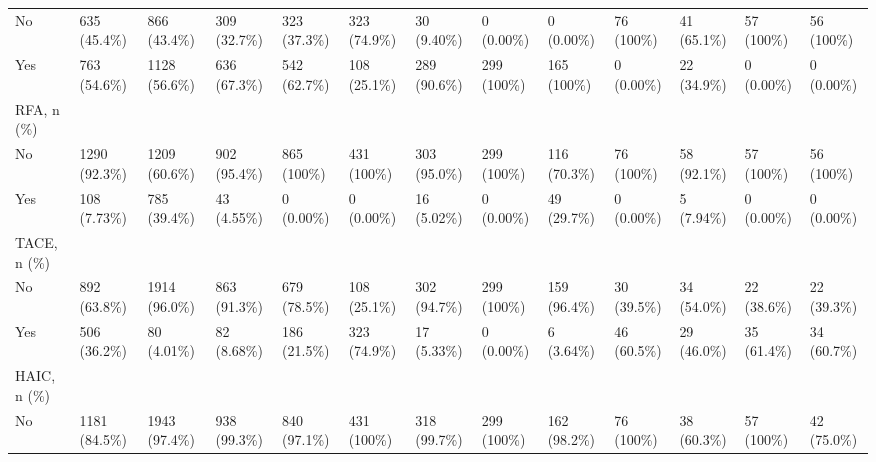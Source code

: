 \begin{landscape}
\begin{center}
\begin{longtable}{p{6.0cm}p{3.0cm}p{3.0cm}p{3.0cm}p{3.0cm}p{3.0cm}p{3.0cm}p{3.0cm}p{3.0cm}p{3.0cm}p{3.0cm}p{3.0cm}p{3.0cm}}
    No &   635 (45.4\%)    &   866 (43.4\%)    &   309 (32.7\%)    &   323 (37.3\%)    &   323 (74.9\%)    &    30 (9.40\%)    &    0 (0.00\%)     &    0 (0.00\%)     &    76 (100\%)     &    41 (65.1\%)    &    57 (100\%)     &    56 (100\%)     \\
    Yes &   763 (54.6\%)    &   1128 (56.6\%)   &   636 (67.3\%)    &   542 (62.7\%)    &   108 (25.1\%)    &   289 (90.6\%)    &    299 (100\%)    &    165 (100\%)    &    0 (0.00\%)     &    22 (34.9\%)    &    0 (0.00\%)     &    0 (0.00\%)     \\
RFA, n (\%) &                  &                  &                  &                  &                  &                  &                  &                  &                  &                  &                  &                  \\
    No &   1290 (92.3\%)   &   1209 (60.6\%)   &   902 (95.4\%)    &    865 (100\%)    &    431 (100\%)    &   303 (95.0\%)    &    299 (100\%)    &   116 (70.3\%)    &    76 (100\%)     &    58 (92.1\%)    &    57 (100\%)     &    56 (100\%)     \\
    Yes &   108 (7.73\%)    &   785 (39.4\%)    &    43 (4.55\%)    &    0 (0.00\%)     &    0 (0.00\%)     &    16 (5.02\%)    &    0 (0.00\%)     &    49 (29.7\%)    &    0 (0.00\%)     &    5 (7.94\%)     &    0 (0.00\%)     &    0 (0.00\%)     \\
TACE, n (\%) &                  &                  &                  &                  &                  &                  &                  &                  &                  &                  &                  &                  \\
    No &   892 (63.8\%)    &   1914 (96.0\%)   &   863 (91.3\%)    &   679 (78.5\%)    &   108 (25.1\%)    &   302 (94.7\%)    &    299 (100\%)    &   159 (96.4\%)    &    30 (39.5\%)    &    34 (54.0\%)    &    22 (38.6\%)    &    22 (39.3\%)    \\
    Yes &   506 (36.2\%)    &    80 (4.01\%)    &    82 (8.68\%)    &   186 (21.5\%)    &   323 (74.9\%)    &    17 (5.33\%)    &    0 (0.00\%)     &    6 (3.64\%)     &    46 (60.5\%)    &    29 (46.0\%)    &    35 (61.4\%)    &    34 (60.7\%)    \\
HAIC, n (\%) &                  &                  &                  &                  &                  &                  &                  &                  &                  &                  &                  &                  \\
    No &   1181 (84.5\%)   &   1943 (97.4\%)   &   938 (99.3\%)    &   840 (97.1\%)    &    431 (100\%)    &   318 (99.7\%)    &    299 (100\%)    &   162 (98.2\%)    &    76 (100\%)     &    38 (60.3\%)    &    57 (100\%)     &    42 (75.0\%)    \\

\end{longtable}
\end{center}
\end{landscape}
